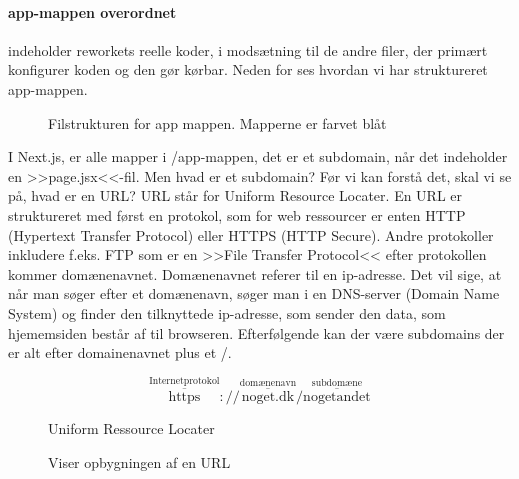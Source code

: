         \paragraph{app-mappen overordnet \label{pgh:app-ov}} indeholder reworkets reelle koder, i modsætning til de andre filer, der primært konfigurer koden og den gør kørbar. 
        Neden for ses hvordan vi har struktureret app-mappen. 
        \begin{figure}[H]
            \caption{Filstrukturen for app mappen. Mapperne er farvet blåt}
            \label{fig:app-mappen}
            \end{figure}
        I Next.js, er alle mapper i /app-mappen, det er et subdomain, når det indeholder en >>page.jsx<<-fil. Men hvad er et subdomain? Før vi kan forstå det, skal vi se på, hvad er en URL? URL står for 
        Uniform Resource Locater. En URL er struktureret med først en protokol, som for web ressourcer er enten HTTP (Hypertext Transfer Protocol) eller HTTPS (HTTP Secure). Andre protokoller inkludere f.eks. FTP som er en >>File Transfer Protocol<<  
        efter protokollen kommer domænenavnet. Domænenavnet referer til en ip-adresse.  Det vil sige, at når man søger efter et domænenavn, søger man i en DNS-server (Domain Name System) og finder den tilknyttede ip-adresse,
        som sender den data, som hjememsiden består af til browseren. Efterfølgende kan der være subdomains der er alt efter domainenavnet plus et /.

        \begin{figure}[H]
        \begin{mdframed}
        \begin{equation*}
        \stackrel{\text{Internetprotokol}}{\overline{\text{https}}}:// \stackrel{\text{domænenavn}}{\overline{\text{noget.dk}}} / \stackrel{\text{subdomæne}}{\overline{\text{nogetandet}}}
        \end{equation*}
        \begin{center}
            Uniform Ressource Locater
        \end{center}
        \end{mdframed}
        \caption{Viser opbygningen af en URL}
        \end{figure}
        \newpage
        
